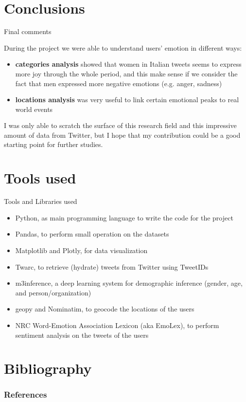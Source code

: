 \documentclass[8pt]{beamer}  %
\begin{document}
\section{Conclusions}

\begin{frame}{Final comments}
    
    During the project we were able to understand users' emotion in different ways:
    
    \begin{itemize}
        \item \textbf{categories analysis} showed that women in Italian tweets seems to express more joy through the whole period, and this make sense if we consider the fact that men expressed more negative emotions (e.g. anger, sadness)
        \item \textbf{locations analysis} was very useful to link certain emotional peaks to real world events
    \end{itemize}
    
    I was only able to scratch the surface of this research field and this impressive amount of data from Twitter, but I hope that my contribution could be a good starting point for further studies. 
    
\end{frame}

\section{Tools used}

\begin{frame}{Tools and Libraries used}

    \begin{itemize}
        \item Python, as main programming language to write the code for the project
        \item Pandas, to perform small operation on the datasets
        \item Matplotlib and Plotly, for data visualization
        \item Twarc, to retrieve (hydrate) tweets from Twitter using TweetIDs
        \item m3inference, a deep learning system for demographic inference (gender, age, and person/organization)
        \item geopy and Nominatim, to geocode the locations of the users
        \item NRC Word-Emotion Association Lexicon (aka EmoLex), to perform sentiment analysis on the tweets of the users
    \end{itemize}
    
\end{frame}

\section{Bibliography}

\begin{frame}[allowframebreaks]
        \frametitle{References}
        \printbibliography
\end{frame}
\end{document}
